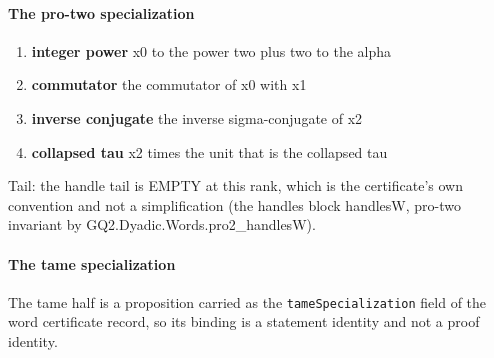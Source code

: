 \paragraph{The pro-two specialization}
\begin{enumerate}
\item[(1)] \textbf{integer power} x0 to the power two plus two to the alpha
\item[(2)] \textbf{commutator} the commutator of x0 with x1
\item[(3)] \textbf{inverse conjugate} the inverse sigma-conjugate of x2
\item[(4)] \textbf{collapsed tau} x2 times the unit that is the collapsed tau
\end{enumerate}
Tail: the handle tail is EMPTY at this rank, which is the certificate's own convention and not a simplification (the handles block handlesW, pro-two invariant by GQ2.Dyadic.Words.pro2\_handlesW).
\paragraph{The tame specialization}
The tame half is a proposition carried as the \texttt{tameSpecialization} field of the word certificate record, so its binding is a statement identity and not a proof identity.
